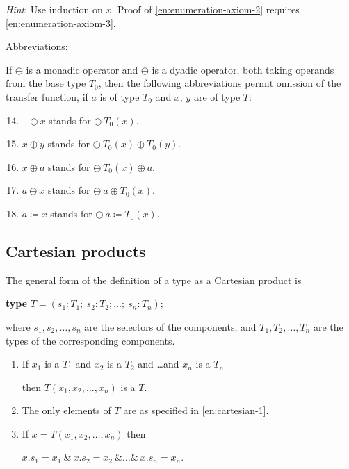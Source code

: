 \documentclass[twoside,11pt]{book}
\begin{document}
\noindent
\textit{Hint}: Use induction on $x$. Proof of \ref{en:enumeration-axiom-2} requires \ref{en:enumeration-axiom-3}.

\noindent
Abbreviations:

\noindent
If $\ominus$ is a monadic operator and $\oplus$ is a dyadic operator, both taking operands from the base type $T_0$, then the following abbreviations permit omission of the transfer function, if $a$ is of type $T_0$ and $x$, $y$ are of type $T$:

\begin{enumerate}[wide, nosep, label=(\arabic*)]
	\setcounter{enumi}{13}
	
	\item ~ $\ominus\ x$ stands for $\ominus\ T_0(x)$.

	\item $x \oplus y$ stands for $\ominus\ T_0(x) \oplus T_0(y)$.
	
	\item $x \oplus a$ stands for $\ominus\ T_0(x) \oplus a.$

	\item $a \oplus x$ stands for $\ominus\ a \oplus T_0(x).$

	\item $a \coloneq x$ stands for $\ominus\ a\coloneq T_0(x)$.
\end{enumerate}

\subsection{Cartesian products}

The general form of the definition of a type as a Cartesian product is

\quad \textbf{type} $T = (s_1 : T_1;\ s_2: T_2; \dots ;\ s_n: T_n);$

\noindent
where $s_1, s_2, \dots , s_n$ are the selectors of the components, and $T_1, T_2, \dots, T_n$ are the types of the corresponding components.

\begin{enumerate}[leftmargin=2\parindent, label=(\arabic*)]
	\item \label{en:cartesian-1}
	If $x_1$ is a $T_1$ and $x_2$ is a $T_2$ and \dots and $x_n$ is a $T_n$

	\quad then $T(x_1, x_2, \dots, x_n)$ is a $T$.

	\item The only elements of $T$ are as specified in \ref{en:cartesian-1}.

	\item If $x = T(x_1, x_2, \dots, x_n)$ then

	\quad $x.s_1 = x_1\ \&\ x.s_2 = x_2\ \& \dots \&\ x.s_n = x_n$.

\end{enumerate}
\end{document}
